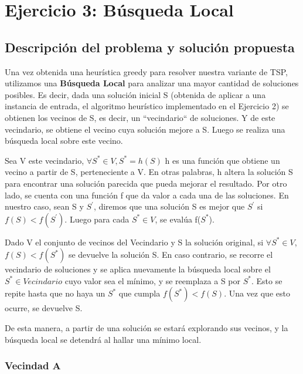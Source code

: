\section{Ejercicio 3: Búsqueda Local}
    \subsection{Descripción del problema y solución propuesta}

    \par Una vez obtenida una heurística greedy para resolver nuestra variante de TSP, utilizamos una \textbf{Búsqueda Local} para analizar una mayor cantidad de soluciones posibles. Es decir, dada una solución inicial S (obtenida de aplicar a una instancia de entrada, el algoritmo heurístico implementado en el Ejercicio 2) se obtienen los vecinos de S, es decir, un “vecindario“ de soluciones. Y de este vecindario, se obtiene el vecino cuya solución mejore a S. Luego se realiza una búsqueda local sobre este vecino. 
    \par Sea V este vecindario, $\forall S^{*}\in V, S^{*} = h(S)$ h es una función que obtiene un vecino a partir de S, perteneciente a V. En otras palabras, h altera la solución S para encontrar una solución parecida que pueda mejorar el resultado. Por otro lado, se cuenta con una función f que da valor a cada una de las soluciones. En nuestro caso, sean S y $S^{'}$, diremos que una solución S es mejor que $S^{'}$ si $f(S) < f(S^{'})$. Luego para cada $S^{*}\in V$, se evalúa f($S^{*}$). 
    \par Dado V el conjunto de vecinos del Vecindario y S la solución original, si $\forall S^{*}\in V$, $f(S) < f(S^{*})$  se devuelve la solución S. En caso contrario, se recorre el vecindario de soluciones y se aplica nuevamente la búsqueda local sobre el $S^{*} \in Vecindario $ cuyo valor sea el mínimo, y se reemplaza a S por $S^{*}$. Esto se repite hasta que no haya un $S^{*}$ que cumpla $f(S^{*}) < f(S)$. Una vez que esto ocurre, se devuelve S. 
    \par De esta manera, a partir de una solución se estará explorando sus vecinos, y la búsqueda local se detendrá al hallar una mínimo local.

    \subsubsection{Vecindad A}

